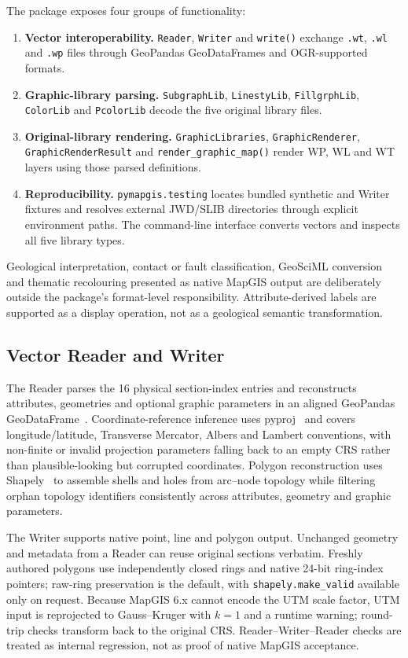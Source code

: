 \documentclass[preprint,12pt,numbers]{elsarticle}
\begin{document}
The package exposes four groups of functionality:
\begin{enumerate}
  \item \textbf{Vector interoperability.} \texttt{Reader}, \texttt{Writer} and \texttt{write()} exchange \texttt{.wt}, \texttt{.wl} and \texttt{.wp} files through GeoPandas GeoDataFrames and OGR-supported formats.
  \item \textbf{Graphic-library parsing.} \texttt{SubgraphLib}, \texttt{LinestyLib}, \texttt{FillgrphLib}, \texttt{ColorLib} and \texttt{PcolorLib} decode the five original library files.
  \item \textbf{Original-library rendering.} \texttt{GraphicLibraries}, \texttt{GraphicRenderer}, \texttt{GraphicRenderResult} and \texttt{render\_graphic\_map()} render WP, WL and WT layers using those parsed definitions.
  \item \textbf{Reproducibility.} \texttt{pymapgis.testing} locates bundled synthetic and Writer fixtures and resolves external JWD/SLIB directories through explicit environment paths. The command-line interface converts vectors and inspects all five library types.
\end{enumerate}

Geological interpretation, contact or fault classification, GeoSciML conversion~\cite{sen2005} and thematic recolouring presented as native MapGIS output are deliberately outside the package's format-level responsibility. Attribute-derived labels are supported as a display operation, not as a geological semantic transformation.

\subsection{Vector Reader and Writer}

The Reader parses the 16 physical section-index entries and reconstructs attributes, geometries and optional graphic parameters in an aligned GeoPandas GeoDataFrame~\cite{geopandas}. Coordinate-reference inference uses pyproj~\cite{pyproj} and covers longitude/latitude, Transverse Mercator, Albers and Lambert conventions, with non-finite or invalid projection parameters falling back to an empty CRS rather than plausible-looking but corrupted coordinates. Polygon reconstruction uses Shapely~\cite{shapely} to assemble shells and holes from arc--node topology while filtering orphan topology identifiers consistently across attributes, geometry and graphic parameters.

The Writer supports native point, line and polygon output. Unchanged geometry and metadata from a Reader can reuse original sections verbatim. Freshly authored polygons use independently closed rings and native 24-bit ring-index pointers; raw-ring preservation is the default, with \texttt{shapely.make\_valid} available only on request. Because MapGIS 6.x cannot encode the UTM scale factor, UTM input is reprojected to Gauss--Kruger with $k=1$ and a runtime warning; round-trip checks transform back to the original CRS. Reader--Writer--Reader checks are treated as internal regression, not as proof of native MapGIS acceptance.
\end{document}
